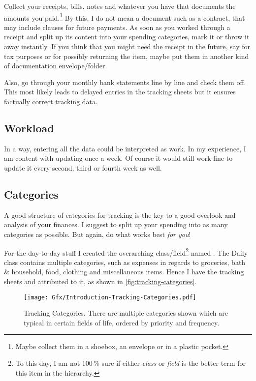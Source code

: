 Collect your receipts, bills, notes and whatever you have that documents the amounts you paid.\footnote{Maybe collect them in a shoebox, an envelope or in a plastic pocket.}
By this, I do not mean a document such as a contract, that may include clauses for future payments.
As soon as you worked through a receipt and split up its content into your spending categories, mark it or throw it away instantly.
If you think that you might need the receipt in the future, say for tax purposes or for possibly returning the item, maybe put them in another kind of documentation envelope/folder.

Also, go through your monthly bank statements line by line and check them off.
This most likely leads to delayed entries in the tracking sheets but it ensures factually correct tracking data.

\subsection{Workload}
\label{subsec:tracking-workload}

In a way, entering all the data could be interpreted as work.
In my experience, I am content with updating \tfn once a week.
Of course it would still work fine to update it every second, third or fourth week as well.

\subsection{Categories}
\label{subsec:tracking-categories}

A good structure of categories for tracking is the key to a good overlook and analysis of your finances.
I suggest to split up your spending into as many categories as possible.
But again, do what works best \emph{for you}!

For the day-to-day stuff I created the overarching class/field\footnote{To this day, I am not 100\,\% sure if either \emph{class} or \emph{field} is the better term for this item in the hierarchy.} named .
The Daily class contains multiple categories, such as expenses in regards to groceries, bath \& household, food, clothing and miscellaneous items.
Hence I have the tracking sheets  and  attributed to it, as shown in \autoref{fig:tracking-categories}.

\begin{figure}[htp]
\centering
\caption[Tracking Categories]{Tracking Categories.
There are multiple categories shown which are typical in certain fields of life, ordered by priority and frequency.
}
\label{fig:tracking-categories}
\texttt{[image: Gfx/Introduction-Tracking-Categories.pdf]}
\end{figure}

